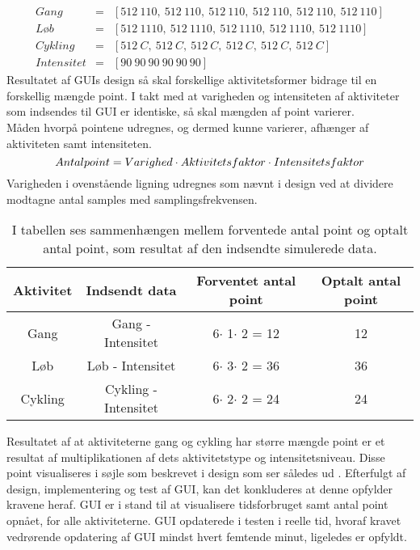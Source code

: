 \begin{eqnarray*}
	Gang &=& [512~110,~512~110,~512~110,~512~110,~512~110,~512~110] \\ 
	L\text{ø}b &=& [512~1110,~512~1110,~512~1110,~512~1110,~512~1110] \\ 
	Cykling &=& [512~C,~512~C,~512~C,~512~C,~512~C,~512~C] \\
	Intensitet &=& [90~90~90~90~90~90] 
\end{eqnarray*}
Resultatet af GUIs design så skal forskellige aktivitetsformer bidrage til en forskellig mængde point. I takt med at varigheden og intensiteten af aktiviteter som indsendes til GUI er identiske, så skal mængden af point varierer. \\
Måden hvorpå pointene udregnes, og dermed kunne varierer, afhænger af aktiviteten samt intensiteten. 
\begin{equation*}
Antal point = Varighed \cdot Aktivitetsfaktor \\ \cdot Intensitetsfaktor
\end{equation*}
Varigheden i ovenstående ligning udregnes som nævnt i design ved at dividere modtagne antal samples med samplingsfrekvensen.

\begin{table}[H]
	\centering
	\begin{tabular}{cccc}
		\hline
		\rowcolor[HTML]{C0C0C0} 
		Aktivitet & Indsendt data & Forventet antal point & Optalt antal point \\ \hline
		Gang & Gang - Intensitet & 6$\cdot$ 1$\cdot$ 2 = 12 & 12 \\ \hline
		Løb & Løb - Intensitet & 6$\cdot$ 3$\cdot$ 2 = 36 & 36 \\ \hline
		Cykling & Cykling - Intensitet & 6$\cdot$ 2$\cdot$ 2 = 24 & 24 \\ \hline
	\end{tabular}
	\caption{I tabellen ses sammenhængen mellem forventede antal point og optalt antal point, som resultat af den indsendte simulerede data.}
	\label{test:GUI}
\end{table}
Resultatet af at aktiviteterne gang og cykling har større mængde point er et resultat af multiplikationen af dets aktivitetstype og intensitetsniveau. Disse point visualiseres i søjle som beskrevet i design som ser således ud .
Efterfulgt af design, implementering og test af GUI, kan det konkluderes at denne opfylder kravene heraf. GUI er i stand til at visualisere tidsforbruget samt antal point opnået, for alle aktiviteterne. GUI opdaterede i testen i reelle tid, hvoraf kravet vedrørende opdatering af GUI mindst hvert femtende minut, ligeledes er opfyldt.

 
